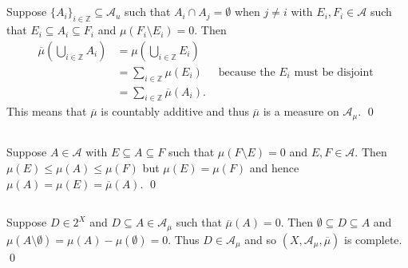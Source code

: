 \documentclass{unswmaths}
\begin{document}
\subsection{}
Suppose $ \{A_i\}_{i \in \mathbb{Z}} \subseteq \mathcal{A}_u $ such that $ A_i \cap A_j = \emptyset $ when $ j \neq i $ with $ E_i, F_i \in \mathcal{A} $ such that $ E_i \subseteq A_i \subseteq F_i $ and $ \mu(F_i \setminus E_i) = 0 $.
Then 
\begin{align*}
    \overline{\mu}\left( \bigcup_{i \in \mathbb{Z}} A_i \right) &= \mu\left( \bigcup_{i \in \mathbb{Z}} E_i \right) \\
    &= \sum_{i \in \mathbb{Z}} \mu(E_i) & \text{ because the } E_i \text{ must be disjoint } \\
    &= \sum_{i \in \mathbb{Z}} \overline{\mu} (A_i).
\end{align*}
This means that $ \overline{\mu} $ is countably additive and thus $ \overline{\mu} $ is a measure on $ \mathcal{A}_\mu $. \qed
\subsection{}
Suppose $ A \in \mathcal{A} $ with $ E \subseteq A \subseteq F $ such that $ \mu(F \setminus E) = 0 $ and $ E, F \in \mathcal{A} $. Then $\mu(E) \leq \mu(A) \leq \mu(F) $ but $ \mu(E) = \mu(F) $ and hence $ \mu(A) = \mu(E) =\overline{\mu}(A) $. \qed

\subsection{}

Suppose $ D \in 2^X $ and $ D \subseteq A \in \mathcal{A}_\mu $ such that $ \overline{\mu}(A) = 0 $. Then $ \emptyset \subseteq D \subseteq A $ and $ \mu( A \setminus \emptyset ) = \mu(A) - \mu(\emptyset) = 0 $. Thus $ D \in \mathcal{A}_\mu $ and so $ (X, \mathcal{A}_\mu, \overline{\mu}) $ is complete. \qed
\end{document}
